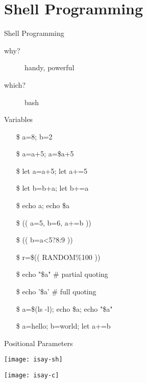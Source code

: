 \section{Shell Programming}
\label{sec:shell-programming}

\begin{frame}{Shell Programming}
  \begin{description}
  \item[why?] handy, powerful 
  \item[which?] bash
  \end{description}
\end{frame}

\begin{frame}{Variables}\ttfamily\small
  \begin{itemize}
  \item[\$] a=8; b=2
  \item[\$] a=a+5; a=\$a+5 \Bad
  \item[\$] let a=a+5; let a+=5 \Good
  \item[\$] let b=b+a; let b+=a \Good
  \item[\$] echo a; echo \$a
  \item[\$] (( a=5, b=6, a+=b )) \Good
  \item[\$] (( b=a<5?8:9 )) \Good
  \item[\$] r=\$(( RANDOM\%100 )) \Good
  \item[\$] echo "\$a" \# partial quoting
  \item[\$] echo '\$a' \# full quoting
  \item[\$] a=\$(ls -l); echo \$a; echo "\$a"
  \item[\$] a=hello; b=world; let a+=b \Bad
  \end{itemize}
\end{frame}

\begin{frame}{Positional Parameters}{}
  \begin{minipage}{.44\linewidth}
    \texttt{[image: isay-sh]}
  \end{minipage}\quad
  \begin{minipage}{.52\linewidth}
    \texttt{[image: isay-c]}
  \end{minipage}
\end{frame}

